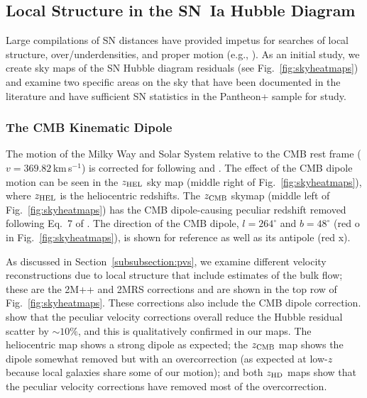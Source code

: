 \documentclass[twocolumn]{aastex63}
\begin{document}
\subsection{Local Structure in the SN~Ia Hubble Diagram}
Large compilations of SN distances have provided impetus for searches of local structure, over/underdensities, and proper motion (e.g., \citealp{Matthews16,Soltis19,Hu20}). As an initial study, we create sky maps of the SN Hubble diagram residuals (see Fig.~\ref{fig:skyheatmaps}) and examine two specific areas on the sky that have been documented in the literature and have sufficient SN statistics in the Pantheon+ sample for study.

\subsubsection{The CMB Kinematic Dipole}

The motion of the Milky Way and Solar System relative to the CMB rest frame ($v= 369.82$\,km\,s$^{-1}$) is corrected for following \cite{carr21} and \cite{peterson21}. The effect of the CMB dipole motion can be seen in the $z_{\rm HEL}$ sky map  (middle right of Fig.~\ref{fig:skyheatmaps}), where $z_{\rm HEL}$ is the heliocentric redshifts. The $z_{\rm CMB}$ skymap (middle left of Fig.~\ref{fig:skyheatmaps}) has the CMB dipole-causing peculiar redshift removed following Eq.~7 of \cite{peterson21}. The direction of the CMB dipole, $l = 264^\circ$ and $b = 48^\circ$ (red o in Fig.~\ref{fig:skyheatmaps}), is shown for reference as well as { its antipole (red x)}.

As discussed in Section~\ref{subsubsection:pvs}, we examine different velocity reconstructions due to local structure that include estimates of the bulk flow; these are the 2M++ \citep{Carrick15} and 2MRS \citep{lilownusser} corrections and are shown in the top row of Fig.~\ref{fig:skyheatmaps}. These corrections also include the CMB dipole correction. \cite{peterson21} show that the peculiar velocity corrections overall reduce the Hubble residual scatter by $\sim10\%$, { and this is qualitatively confirmed in our maps.  The heliocentric map shows a strong dipole as expected; the $z_{\rm CMB}$ map shows the dipole somewhat removed but with an overcorrection (as expected at low-$z$ because local galaxies share some of our motion); and both $z_{\rm HD}$ maps show that the peculiar velocity corrections have removed most of the overcorrection}. 
\end{document}
